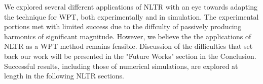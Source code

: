We explored several different applications of NLTR with an eye towards adapting the technique for WPT, both experimentally and in simulation. The experimental portions met with limited success due to the diffculty of passively producing harmonics of significant magnitude. However, we believe the the applications of NLTR as a WPT method remains feasible. Discussion of the difficulties that set back our work will be presented in the "Future Works" section in the Conclusion. Successful results, including those of numerical simulations, are explored at length in the following NLTR sections. 
